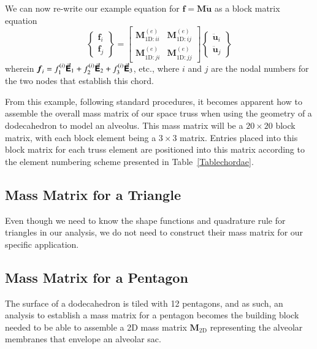 We can now re-write our example equation for $\boldsymbol{f} = \mathbf{M} \ddot{\boldsymbol{u}}$ as a block matrix equation
\begin{displaymath}
\left\{ \begin{matrix} 
\boldsymbol{f}_i \\ \boldsymbol{f}_j
\end{matrix} \right\} = 
\begin{bmatrix}
\mathbf{M}^{(e)}_{\mathrm{1D}:ii} & \mathbf{M}^{(e)}_{\mathrm{1D}:ij} \\
\mathbf{M}^{(e)}_{\mathrm{1D}:ji} & \mathbf{M}^{(e)}_{\mathrm{1D}:jj}
\end{bmatrix} \left\{ \begin{matrix} 
\ddot{\boldsymbol{u}}_i \\ \ddot{\boldsymbol{u}}_j
\end{matrix} \right\}
\end{displaymath} 
wherein $\boldsymbol{f}_i = f^{(i)}_1 \vec{\boldsymbol{\mathsf{E}}}_1 + f^{(i)}_2 \vec{\boldsymbol{\mathsf{E}}}_2 + f^{(i)}_3 \vec{\boldsymbol{\mathsf{E}}}_3$, etc., where $i$ and $j$ are the nodal numbers for the two nodes that establish this chord.

From this example, following standard procedures, \cite{ClaytonChung18} it becomes apparent how to assemble the overall mass matrix of our space truss when using the geometry of a dodecahedron to model an alveolus.  This mass matrix will be a $20 \! \times \! 20$ block matrix, with each block element being a $3 \! \times \! 3$ matrix.  Entries placed into this block matrix for each truss element are positioned into this matrix according to the element numbering scheme presented in Table~\ref{Tablechordae}.

\subsection{Mass Matrix for a Triangle}

Even though we need to know the shape functions and quadrature rule for triangles in our analysis, we do not need to construct their mass matrix for our specific application.

\subsection{Mass Matrix for a Pentagon}

The surface of a dodecahedron is tiled with 12 pentagons, and as such, an analysis to establish a mass matrix for a pentagon becomes the building block needed to be able to assemble a 2D mass matrix $\mathbf{M}_{\mathrm{2D}}$ representing the alveolar membranes that envelope an alveolar sac.

